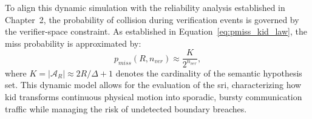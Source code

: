 To align this dynamic simulation with the reliability analysis established in Chapter~2, the probability of collision during verification events is governed by the verifier-space constraint. As established in Equation~\ref{eq:pmiss_kid_law}, the miss probability is approximated by:
\begin{equation}
    p_{miss}(R, n_{ver}) \approx \frac{K}{2^{n_{ver}}},
\end{equation}
where $K = |\mathcal{A}_R| \approx 2R/\Delta + 1$ denotes the cardinality of the semantic hypothesis set. This dynamic model allows for the evaluation of the \gls{sri}, characterizing how \gls{kid} transforms continuous physical motion into sporadic, bursty communication traffic while managing the risk of undetected boundary breaches.
